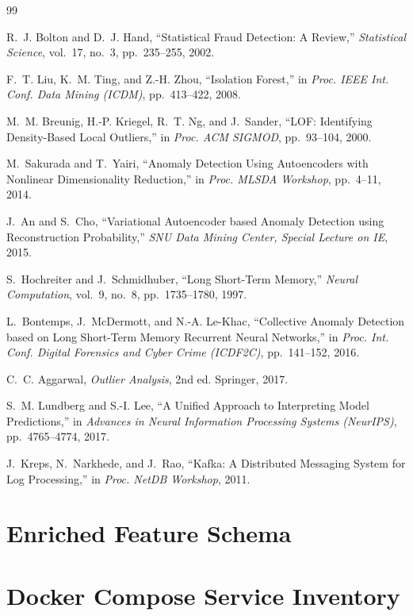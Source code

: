 \documentclass[a4paper,12pt]{report}
\begin{document}
\begin{thebibliography}{99}

R.~J. Bolton and D.~J. Hand,
``Statistical Fraud Detection: A Review,''
\textit{Statistical Science}, vol.~17, no.~3, pp.~235--255, 2002.

F.~T. Liu, K.~M. Ting, and Z.-H. Zhou,
``Isolation Forest,''
in \textit{Proc. IEEE Int. Conf. Data Mining (ICDM)}, pp.~413--422, 2008.

M.~M. Breunig, H.-P. Kriegel, R.~T. Ng, and J.~Sander,
``LOF: Identifying Density-Based Local Outliers,''
in \textit{Proc. ACM SIGMOD}, pp.~93--104, 2000.

M.~Sakurada and T.~Yairi,
``Anomaly Detection Using Autoencoders with Nonlinear Dimensionality Reduction,''
in \textit{Proc. MLSDA Workshop}, pp.~4--11, 2014.

J.~An and S.~Cho,
``Variational Autoencoder based Anomaly Detection using Reconstruction Probability,''
\textit{SNU Data Mining Center, Special Lecture on IE}, 2015.

S.~Hochreiter and J.~Schmidhuber,
``Long Short-Term Memory,''
\textit{Neural Computation}, vol.~9, no.~8, pp.~1735--1780, 1997.

L.~Bontemps, J.~McDermott, and N.-A. Le-Khac,
``Collective Anomaly Detection based on Long Short-Term Memory Recurrent Neural Networks,''
in \textit{Proc. Int. Conf. Digital Forensics and Cyber Crime (ICDF2C)}, pp.~141--152, 2016.

C.~C. Aggarwal,
\textit{Outlier Analysis}, 2nd ed.
Springer, 2017.

S.~M. Lundberg and S.-I. Lee,
``A Unified Approach to Interpreting Model Predictions,''
in \textit{Advances in Neural Information Processing Systems (NeurIPS)}, pp.~4765--4774, 2017.

J.~Kreps, N.~Narkhede, and J.~Rao,
``Kafka: A Distributed Messaging System for Log Processing,''
in \textit{Proc. NetDB Workshop}, 2011.

\end{thebibliography}
\appendix
\chapter{Enriched Feature Schema}


\chapter{Docker Compose Service Inventory}


\clearpage
\thispagestyle{empty}
\end{document}

